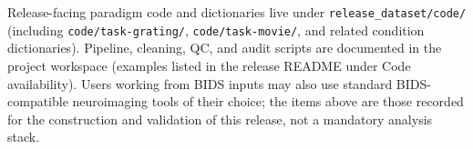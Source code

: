 Release-facing paradigm code and dictionaries live under \texttt{release\_dataset/code/} (including \texttt{code/task-grating/}, \texttt{code/task-movie/}, and related condition dictionaries).
Pipeline, cleaning, QC, and audit scripts are documented in the project workspace (examples listed in the release README under Code availability).
Users working from BIDS inputs may also use standard BIDS-compatible neuroimaging tools of their choice; the items above are those recorded for the construction and validation of this release, not a mandatory analysis stack.
